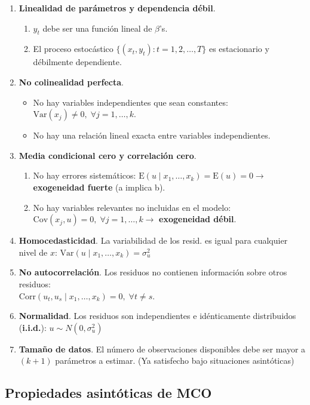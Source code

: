 \documentclass[10pt, a4paper, landscape]{extarticle}
\newcommand{\E}{\mathrm{E}}
\newcommand{\Var}{\mathrm{Var}}
\newcommand{\Cov}{\mathrm{Cov}}
\newcommand{\Corr}{\mathrm{Corr}}
\begin{document}
\begin{multicols}{3}
\begin{enumerate}[leftmargin=*, label=t\arabic*.]
	\item \textbf{Linealidad de parámetros y dependencia débil}.
	\begin{enumerate}[leftmargin=*, label=\alph*.]
		\item $y_t$ debe ser una función lineal de $\beta$'s.
		\item El proceso estocástico $\lbrace(x_t, y_t) : t = 1, 2, \ldots, T\rbrace$ es estacionario y débilmente dependiente.
	\end{enumerate}
	\item \textbf{No colinealidad perfecta}.
	\begin{itemize}[leftmargin=*]
		\item No hay variables independientes que sean constantes: $\Var(x_j) \neq 0, \; \forall j = 1, \ldots, k$.
		\item No hay una relación lineal exacta entre variables independientes.
	\end{itemize}
	\item \textbf{Media condicional cero y correlación cero}.
	\begin{enumerate}[leftmargin=*, label=\alph*.]
		\item No hay errores sistemáticos: $\E(u \mid x_1, \ldots, x_k) = \E(u) = 0 \rightarrow$ \textbf{exogeneidad fuerte} (a implica b).
		\item No hay variables relevantes no incluidas en el modelo: $\Cov(x_j , u) = 0, \; \forall j = 1, \ldots, k \rightarrow$ \textbf{exogeneidad débil}.
	\end{enumerate}
	\item \textbf{Homocedasticidad}. La variabilidad de los resid. es igual para cualquier nivel de $x$: $\Var(u \mid x_1, \ldots, x_k) = \sigma^2_u$
	\item \textbf{No autocorrelación}. Los residuos no contienen información sobre otros residuos: \\ $\Corr(u_t, u_s \mid x_1, \ldots, x_k) = 0, \; \forall t \neq s$.
	\item \textbf{Normalidad}. Los residuos son independientes e idénticamente distribuidos (\textbf{i.i.d.}): $u \sim N(0, \sigma^2_u)$
			\item \textbf{Tamaño de datos}. El número de observaciones disponibles debe ser mayor a $(k + 1)$ parámetros a estimar. (Ya satisfecho bajo situaciones asintóticas)
\end{enumerate}

\subsection*{Propiedades asintóticas de MCO}


\end{multicols}
\end{document}
